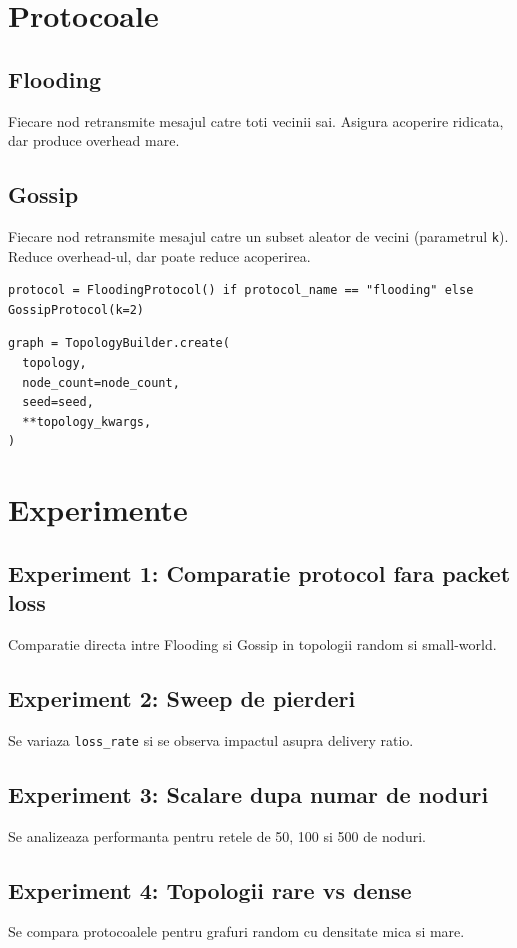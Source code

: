 \documentclass[12pt,a4paper]{article}
\begin{document}
\section{Protocoale}
\subsection{Flooding}
Fiecare nod retransmite mesajul catre toti vecinii sai. Asigura acoperire ridicata, dar produce overhead mare.

\subsection{Gossip}
Fiecare nod retransmite mesajul catre un subset aleator de vecini (parametrul \texttt{k}). Reduce overhead-ul, dar poate reduce acoperirea.

\begin{lstlisting}
protocol = FloodingProtocol() if protocol_name == "flooding" else GossipProtocol(k=2)
\end{lstlisting}

\begin{lstlisting}
graph = TopologyBuilder.create(
  topology,
  node_count=node_count,
  seed=seed,
  **topology_kwargs,
)
\end{lstlisting}

\section{Experimente}
\subsection{Experiment 1: Comparatie protocol fara packet loss}
Comparatie directa intre Flooding si Gossip in topologii random si small-world.

\subsection{Experiment 2: Sweep de pierderi}
Se variaza \texttt{loss\_rate} si se observa impactul asupra delivery ratio.

\subsection{Experiment 3: Scalare dupa numar de noduri}
Se analizeaza performanta pentru retele de 50, 100 si 500 de noduri.

\subsection{Experiment 4: Topologii rare vs dense}
Se compara protocoalele pentru grafuri random cu densitate mica si mare.
\end{document}
